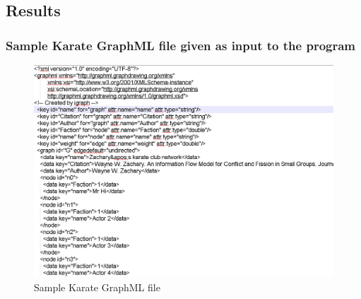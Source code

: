 
\newpage

\subsection{Results}
\subsubsection{Sample Karate GraphML file given as input to the program}
\begin{figure}[ht]    
    \begin{center}
        \includegraphics[scale=0.6]{input.png}
        \caption{Sample Karate GraphML file}
        \label{g1}
    \end{center}
\end{figure}
\newpage
